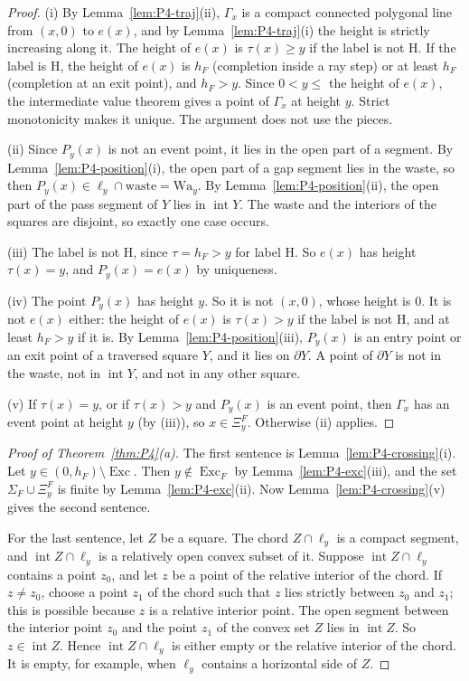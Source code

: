 \documentclass[11pt]{amsart}
\newcommand{\Exc}{\operatorname{Exc}}
\theoremstyle{definition}
\theoremstyle{remark}
\numberwithin{equation}{section}
\begin{document}
\begin{proof}
(i) By Lemma~\ref{lem:P4-traj}(ii), $\Gamma_x$ is a compact connected polygonal line from $(x,0)$ to $e(x)$, and by Lemma~\ref{lem:P4-traj}(i) the height is strictly increasing along it. The height of $e(x)$ is $\tau(x)\ge y$ if the label is not H. If the label is H, the height of $e(x)$ is $h_F$ (completion inside a ray step) or at least $h_F$ (completion at an exit point), and $h_F>y$. Since $0<y\le$ the height of $e(x)$, the intermediate value theorem gives a point of $\Gamma_x$ at height $y$. Strict monotonicity makes it unique. The argument does not use the pieces.

(ii) Since $P_y(x)$ is not an event point, it lies in the open part of a segment. By Lemma~\ref{lem:P4-position}(i), the open part of a gap segment lies in the waste, so then $P_y(x)\in\ell_y\cap\text{waste}=\mathrm{Wa}_y$. By Lemma~\ref{lem:P4-position}(ii), the open part of the pass segment of $Y$ lies in $\operatorname{int}Y$. The waste and the interiors of the squares are disjoint, so exactly one case occurs.

(iii) The label is not H, since $\tau=h_F>y$ for label H. So $e(x)$ has height $\tau(x)=y$, and $P_y(x)=e(x)$ by uniqueness.

(iv) The point $P_y(x)$ has height $y$. So it is not $(x,0)$, whose height is $0$. It is not $e(x)$ either: the height of $e(x)$ is $\tau(x)>y$ if the label is not H, and at least $h_F>y$ if it is. By Lemma~\ref{lem:P4-position}(iii), $P_y(x)$ is an entry point or an exit point of a traversed square $Y$, and it lies on $\partial Y$. A point of $\partial Y$ is not in the waste, not in $\operatorname{int}Y$, and not in any other square.

(v) If $\tau(x)=y$, or if $\tau(x)>y$ and $P_y(x)$ is an event point, then $\Gamma_x$ has an event point at height $y$ (by (iii)), so $x\in\Xi^F_y$. Otherwise (ii) applies.
\end{proof}

\begin{proof}[Proof of Theorem~\ref{thm:P4}(a)]
The first sentence is Lemma~\ref{lem:P4-crossing}(i). Let $y\in(0,h_F)\setminus\Exc$. Then $y\notin\Exc_F$ by Lemma~\ref{lem:P4-exc}(iii), and the set $\Sigma_F\cup\Xi^F_y$ is finite by Lemma~\ref{lem:P4-exc}(ii). Now Lemma~\ref{lem:P4-crossing}(v) gives the second sentence.

For the last sentence, let $Z$ be a square. The chord $Z\cap\ell_y$ is a compact segment, and $\operatorname{int}Z\cap\ell_y$ is a relatively open convex subset of it. Suppose $\operatorname{int}Z\cap\ell_y$ contains a point $z_0$, and let $z$ be a point of the relative interior of the chord. If $z\ne z_0$, choose a point $z_1$ of the chord such that $z$ lies strictly between $z_0$ and $z_1$; this is possible because $z$ is a relative interior point. The open segment between the interior point $z_0$ and the point $z_1$ of the convex set $Z$ lies in $\operatorname{int}Z$. So $z\in\operatorname{int}Z$. Hence $\operatorname{int}Z\cap\ell_y$ is either empty or the relative interior of the chord. It is empty, for example, when $\ell_y$ contains a horizontal side of $Z$.
\end{proof}
\end{document}
